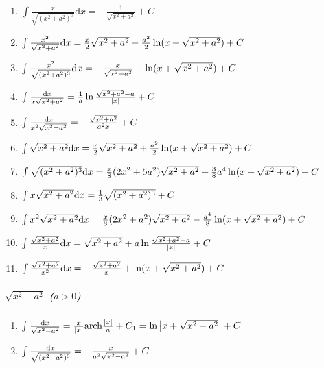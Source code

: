\begin{tiny}
\begin{enumerate}
\item $ \int \frac{x}{\sqrt{(x^2+a^2)^3}} \mathrm{d}x = -\frac{1}{\sqrt{x^2+a^2}} + C $

\item $ \int \frac{x^2}{\sqrt{x^2+a^2}} \mathrm{d} x = \frac{x}{2}\sqrt{x^2+a^2} - \frac{a^2}{2}\ln(x+\sqrt{x^2+a^2}) + C $

\item $ \int \frac{x^2}{\sqrt{(x^2+a^2)^3}} \mathrm{d} x = -\frac{x}{\sqrt{x^2+a^2}} + \ln(x+\sqrt{x^2+a^2}) + C $

\item $ \int \frac{\mathrm{d} x}{x\sqrt{x^2+a^2}} = \frac{1}{a} \ln \frac{\sqrt{x^2+a^2}-a}{|x|} + C $

\item $ \int \frac{\mathrm{d} x}{x^2\sqrt{x^2+a^2}} = -\frac{\sqrt{x^2+a^2}}{a^2x} + C $

\item $ \int \sqrt{x^2+a^2} \mathrm{d} x = \frac{x}{2}\sqrt{x^2+a^2}+\frac{a^2}{2}\ln(x + \sqrt{x^2+a^2}) + C $

\item $ \int \sqrt{(x^2+a^2)^3} \mathrm{d} x = \frac{x}{8}(2x^2+5a^2)\sqrt{x^2+a^2} + \frac{3}{8}a^4\ln(x + \sqrt{x^2+a^2}) + C $

\item $ \int x \sqrt{x^2+a^2} \mathrm{d} x = \frac{1}{3} \sqrt{(x^2+a^2)^3} + C $

\item $ \int x^2\sqrt{x^2+a^2} \mathrm{d} x = \frac{x}{8}(2x^2+a^2)\sqrt{x^2+a^2} - \frac{a^4}{8}\ln(x+\sqrt{x^2+a^2}) + C $

\item $ \int \frac{\sqrt{x^2+a^2}}{x} \mathrm{d} x = \sqrt{x^2+a^2} + a \ln \frac{\sqrt{x^2+a^2}-a}{|x|} + C $

\item $ \int \frac{\sqrt{x^2+a^2}}{x^2} \mathrm{d} x = -\frac{\sqrt{x^2+a^2}}{x} + \ln(x + \sqrt{x^2+a^2}) + C $

\end{enumerate}

\subparagraph{$\sqrt{x^2-a^2}$ ($a>0$)}

\begin{enumerate}

\item $ \int \frac{\mathrm{d} x}{\sqrt{x^2-a^2}} = \frac{x}{|x|} \mathrm{arch} \frac{|x|}{a} + C_1 = \ln\left|x+\sqrt{x^2-a^2}\right| + C $

\item $ \int \frac{\mathrm{d} x}{\sqrt{(x^2-a^2)^3}} = -\frac{x}{a^2\sqrt{x^2-a^2}} + C$


\end{enumerate}
\end{tiny}
